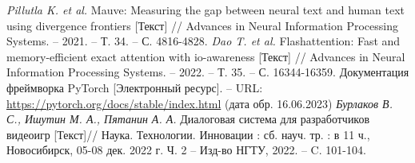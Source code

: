 \begin{thebibliography}{99}
  \textit{Pillutla K. et al.} Mauve: Measuring the gap between neural text and human text using divergence frontiers [Текст] // Advances in Neural Information Processing Systems. – 2021. – Т. 34. – С. 4816-4828.
  \textit{Dao T. et al.} Flashattention: Fast and memory-efficient exact attention with io-awareness [Текст] // Advances in Neural Information Processing Systems. – 2022. – Т. 35. – С. 16344-16359.
  Документация фреймворка PyTorch [Электронный ресурс]. -- URL: \url{https://pytorch.org/docs/stable/index.html} (дата обр. 16.06.2023)
  \textit{Бурлаков В. С., Ишутин М. А., Пятанин А. А.} Диалоговая система для разработчиков видеоигр [Текст]// Наука. Технологии. Инновации : сб. науч. тр. : в 11 ч., Новосибирск, 05-08 дек. 2022 г. Ч. 2 -- Изд-во НГТУ, 2022. -- C. 101-104.
\end{thebibliography}
